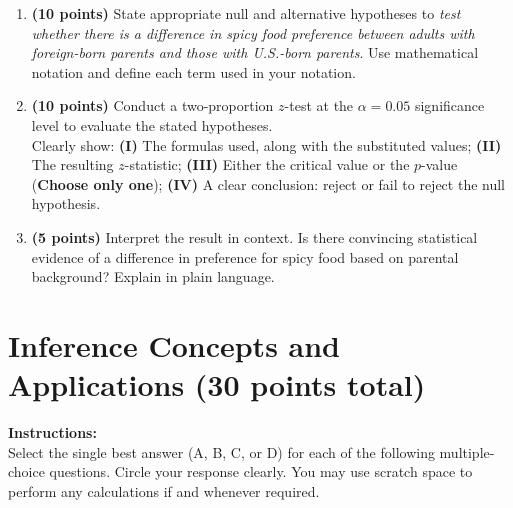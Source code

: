 \documentclass{article}
\newcommand{\blankbox}[2][3cm]{%
    \vspace{-0.5em}
    \begin{figure}[H]
        \makebox[\linewidth]{%
            \begin{tcolorbox}[
                colback=white, 
                colframe=white,  %
                width=#2, %
                height=#1,
                boxrule=0.2mm
            ]
            \end{tcolorbox}
        }
    \end{figure}
    \vspace{-2em}
}
\begin{document}
\begin{enumerate}
    \item \textbf{(10 points)} State appropriate null and alternative hypotheses to \emph{test whether there is a difference in spicy food preference between adults with foreign-born parents and those with U.S.-born parents}. Use mathematical notation and define each term used in your notation. \blankbox[3cm]{1.0\linewidth}
    
    \item \textbf{(10 points)} Conduct a two-proportion $z$-test at the $\alpha = 0.05$ significance level to evaluate the stated hypotheses. \\
    Clearly show: \textbf{(I)} The formulas used, along with the substituted values;  
    \textbf{(II)} The resulting $z$-statistic;  
    \textbf{(III)} Either the critical value or the $p$-value (\textbf{Choose only one});  
    \textbf{(IV)} A clear conclusion: reject or fail to reject the null hypothesis.  
    \blankbox[9cm]{1.0\linewidth}

    \item  \textbf{(5 points)}  Interpret the result in context. Is there convincing statistical evidence of a difference in preference for spicy food based on parental background? Explain in plain language. \blankbox[6cm]{1.0\linewidth}
\end{enumerate}


\newpage
\section{Inference Concepts and Applications (30 points total)} 
\noindent\textbf{Instructions:} \\
Select the single best answer (A, B, C, or D) for each of the following multiple-choice questions. Circle your response clearly. You may use scratch space to perform any calculations if and whenever required.
\end{document}
